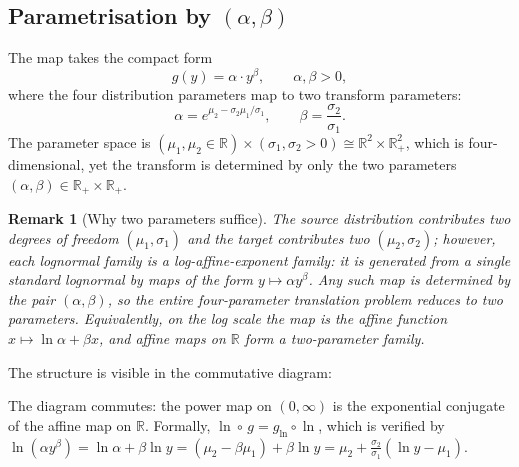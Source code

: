 \documentclass[11pt,a4paper]{article}
\newtheorem{remark}{Remark}
\newcommand{\N}{\mathcal{N}}
\newcommand{\LN}{\operatorname{LogN}}
\newcommand{\R}{\mathbb{R}}
\newcommand{\Rp}{\mathbb{R}_{+}}
\begin{document}
\subsection{Parametrisation by $(\alpha,\beta)$}
\label{sec:alpha-beta}

The map takes the compact form
\[
  g(y)=\alpha\cdot y^{\beta},
  \qquad \alpha,\beta>0,
\]
where the four distribution parameters map to two transform parameters:
\[
  \alpha=e^{\mu_2-\sigma_2\mu_1/\sigma_1},\qquad\beta=\frac{\sigma_2}{\sigma_1}.
\]
The parameter space is $(\mu_1,\mu_2\in\R)\times(\sigma_1,\sigma_2>0)\cong\R^2\times\Rp^2$,
which is four-dimensional, yet the transform is determined by only the two parameters
$(\alpha,\beta)\in\Rp\times\Rp$.

\begin{remark}[Why two parameters suffice]
The source distribution contributes two degrees of freedom $(\mu_1,\sigma_1)$ and the target
contributes two $(\mu_2,\sigma_2)$; however, each lognormal family is a
\emph{log-affine-exponent} family: it is generated from a single standard lognormal by maps of
the form $y\mapsto\alpha y^\beta$.  Any such map is determined by the pair $(\alpha,\beta)$, so
the entire four-parameter translation problem reduces to two parameters.  Equivalently, on the
log scale the map is the affine function
$x\mapsto\ln\alpha+\beta x$, and affine maps on $\R$ form a two-parameter family.
\end{remark}

The structure is visible in the commutative diagram:
\medskip
\begin{center}
\end{center}
\medskip
The diagram commutes: the power map on $(0,\infty)$ is the exponential conjugate of the affine
map on $\R$.  Formally, $\ln\circ\, g=g_{\ln}\circ\ln$, which is verified by
$\ln(\alpha y^\beta)=\ln\alpha+\beta\ln y=(\mu_2-\beta\mu_1)+\beta\ln y
=\mu_2+\frac{\sigma_2}{\sigma_1}(\ln y-\mu_1)$.
\end{document}
